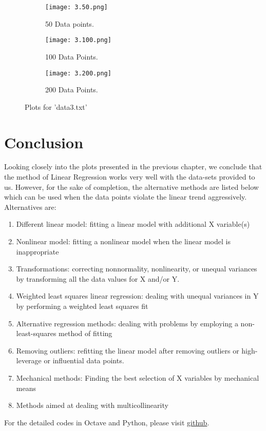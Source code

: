 \documentclass[a4paper, 12pt]{report}
\begin{document}
\begin{figure}
\centering
\begin{subfigure}{.55\textwidth}
  \centering
  \texttt{[image: 3.50.png]}
  \caption{50 Data points.}
\end{subfigure}%
\begin{subfigure}{.55\textwidth}
  \centering
  \texttt{[image: 3.100.png]}
  \caption{100 Data Points.}
\end{subfigure}
\begin{subfigure}{.6\textwidth}
  \centering
  \texttt{[image: 3.200.png]}
  \caption{200 Data Points.}
\end{subfigure}
\caption{Plots for 'data3.txt'}
\label{fig:3}
\end{figure}

\chapter{Conclusion}
Looking closely into the plots presented in the previous chapter, we conclude that the method of Linear Regression works very well with the data-sets provided to us. However, for the sake of completion, the alternative methods are listed below which can be used when the data points violate the linear trend aggressively.\\
Alternatives are:
\begin{enumerate}
\item Different linear model: fitting a linear model with additional X variable(s)
\item Nonlinear model: fitting a nonlinear model when the linear model is inappropriate
\item Transformations: correcting nonnormality, nonlinearity, or unequal variances by transforming all the data values for X and/or Y.
\item Weighted least squares linear regression: dealing with unequal variances in Y by performing a weighted least squares fit
\item Alternative regression methods: dealing with problems by employing a non-least-squares method of fitting
\item Removing outliers: refitting the linear model after removing outliers or high-leverage or influential data points.
\item Mechanical methods: Finding the best selection of X variables by mechanical means
\item Methods aimed at dealing with multicollinearity
\end{enumerate}
 
 For the detailed codes in Octave and Python, please visit \href{https://github.com/YashIITM/Linear-Regression-Using-Octave-and-Python}{github}.
     \printbibliography

    \appendix

  
\end{document}
